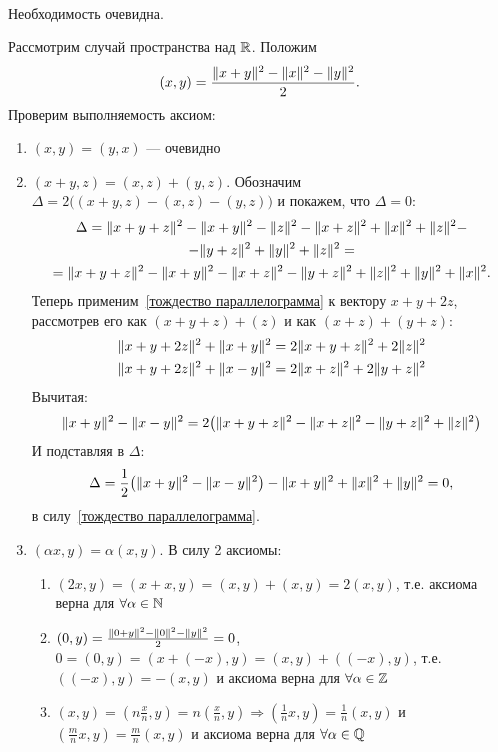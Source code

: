 \begin{proofocre}
~\\
\boxed{\Rightarrow} Необходимость очевидна.

\boxed{\Leftarrow} Рассмотрим случай пространства над ${\mathbb{R}}$. Положим
$$(x, y) = \frac{\|x + y\|^2 - \|x\|^2 - \|y\|^2}{2}.$$
Проверим выполняемость аксиом:
\begin{enumerate}
    \item $(x, y) = (y, x)$ --- очевидно
    \item $(x + y, z) = (x, z) + (y, z)$. Обозначим $\Delta = 2\big( (x + y, z) - (x, z) - (y, z) \big)$ и покажем, что $\Delta = 0$:
    \begin{multline*}
        \Delta = \|x + y + z\|^2 - \|x + y\|^2 - \|z\|^2 - \|x + z\|^2 + \|x\|^2 + \|z\|^2 - \\ - \|y + z\|^2 + \|y\|^2 + \|z\|^2 = \\ = \|x + y + z\|^2 - \|x + y\|^2 - \|x + z\|^2 - \|y + z\|^2 + \|z\|^2 + \|y\|^2 + \|x\|^2.
    \end{multline*}
    Теперь применим~\ref{тождество параллелограмма} к вектору $x + y + 2z$, рассмотрев его как $(x + y + z) + (z)$ и как $(x + z) + (y + z)$:
    \begin{gather*}
        \|x + y + 2z\|^2 + \|x + y\|^2 = 2\|x + y + z\|^2 + 2\|z\|^2\\
        \|x + y + 2z\|^2 + \|x - y\|^2 = 2\|x + z\|^2 + 2\|y + z\|^2
    \end{gather*}
    Вычитая:
    $$\|x + y\|^2 - \|x - y\|^2 = 2\big(\|x + y +z\|^2 -\|x + z\|^2 - \|y + z\|^2 + \|z\|^2\big)$$
    И подставляя в $\Delta$:
    $$\Delta = \frac{1}{2}\big(\|x + y\|^2 - \|x - y\|^2\big) - \|x + y\|^2 + \|x\|^2 + \|y\|^2 = 0,$$
    в силу~\ref{тождество параллелограмма}.
    \item $(\alpha x, y) = \alpha(x, y)$. В силу 2 аксиомы:
    \begin{enumerate}
        \item $(2x, y) = (x + x, y) = (x, y) + (x, y) = 2(x, y)$, т.е. аксиома верна для $\forall \alpha\in{\mathbb{N}}$
        \item $(0, y) = \frac{\|0 + y\|^2 - \|0\|^2 - \|y\|^2}{2} = 0$,\\
        $0 = (0, y) = (x + (-x), y) = (x, y) + ((-x), y)$, т.е. $((-x), y) = -(x,y)$ и аксиома верна для $\forall\alpha\in{\mathbb{Z}}$
        \item $(x, y) = (n\frac{x}{n}, y) = n(\frac{x}{n}, y) \Rightarrow (\frac{1}{n}x, y) = \frac{1}{n}(x, y)$ и $(\frac{m}{n}x, y) = \frac{m}{n}(x, y)$ и аксиома верна для $\forall\alpha\in{\mathbb{Q}}$

\end{enumerate}
\end{enumerate}
\end{proofocre}
